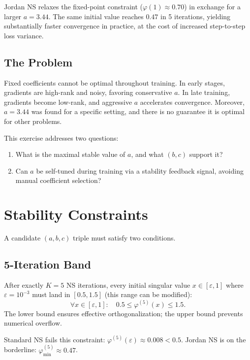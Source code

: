 \documentclass[11pt,a4paper]{article}
\newcommand{\poly}{\varphi}
\begin{document}
Jordan NS relaxes the fixed-point constraint ($\poly(1) \approx 0.70$) in
exchange for a larger $a = 3.44$.  The same initial value reaches $0.47$ in 5 iterations, yielding substantially faster convergence in practice,
at the cost of increased step-to-step loss variance.

\subsection{The Problem}

Fixed coefficients cannot be optimal throughout training.  In early
stages, gradients are high-rank and noisy, favoring conservative $a$.
In late training, gradients become low-rank, and aggressive $a$
accelerates convergence.  Moreover, $a=3.44$ was found for a specific
setting, and there is no guarantee it is optimal for other problems.

This exercise addresses two questions:
\begin{enumerate}[nosep]
    \item What is the maximal stable value of $a$, and what $(b,c)$
          support it?
    \item Can $a$ be self-tuned during training via a stability
          feedback signal, avoiding manual coefficient selection?
\end{enumerate}

\section{Stability Constraints}

A candidate $(a,b,c)$ triple must satisfy two conditions.

\subsection{5-Iteration Band}

After exactly $K=5$ NS iterations, every initial singular value
$x \in [\varepsilon, 1]$ where $\varepsilon = 10^{-3}$ must land in
$[0.5, 1.5]$ (this range can be modified):
\begin{equation}\label{eq:band}
\forall x \in [\varepsilon, 1]: \quad 0.5 \leq \poly^{(5)}(x) \leq 1.5.
\end{equation}
The lower bound ensures effective orthogonalization; the upper bound
prevents numerical overflow.

Standard NS fails this constraint:
$\poly^{(5)}(\varepsilon) \approx 0.008 < 0.5$.
Jordan NS is on the borderline: $\poly^{(5)}_{\min} \approx 0.47$. 
\end{document}
